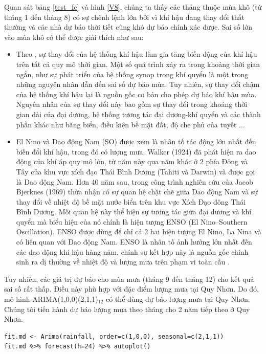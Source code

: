 \documentclass[12pt, a4paper,oneside]{book}
\theoremstyle{definition}
\begin{document}
Quan sát bảng \ref{test_fc} và hình \ref{V8}, chúng ta thấy các tháng thuộc mùa khô (từ tháng 1 đến tháng 8) có sự chênh lệnh lớn bởi vì khí hậu đang thay đổi thất thường và các nhà dự báo thời tiết cũng khó dự báo chính xác được. Sai số lớn vào mùa khô có thể được giải thích như sau:
\begin{itemize}
	\item Theo \cite{22}, sự thay đổi của hệ thống khí hậu làm gia tăng biến động của khí hậu trên tất cả quy mô thời gian. Một số quá trình xảy ra trong khoảng thời gian ngắn, như sự phát triển của hệ thống synop trong khí quyển là một trong những nguyên nhân dẫn đến sai số dự báo mùa. Tuy nhiên, sự thay đổi chậm của hệ thống khí hậu lại là nguồn gốc cơ bản cho phép dự báo khí hậu mùa. Nguyên nhân của sự thay đổi này bao gồm sự thay đổi trong khoảng thời gian dài của đại dương, hệ thống tương tác đại dương-khí quyển và các thành phần khác như băng biển, điều kiện bề mặt đất, độ che phủ của tuyết ...
	\item El Nino và Dao động Nam (SO) được xem là nhân tố tác động lớn nhất đến biến đổi khí hậu, trong đó có lượng mưa. Walker (1924) đã phát hiện ra dao động của khí áp quy mô lớn, từ năm này qua năm khác ở 2 phía Đông và Tây của khu vực xích đạo Thái Bình Dương (Tahiti và Darwin) và được gọi là Dao động Nam. Hơn 40 năm sau, trong công trình nghiên cứu của Jacob Bjerknes (1969) thừa nhận có sự quan hệ chặt chẽ giữa Dao động Nam và sự thay đổi về nhiệt độ bề mặt nước biển trên khu vực Xích Đạo đông Thái Bình Dương. Mối quan hệ này thể hiện sự tương tác giữa đại dương và khí quyển mà biểu hiện của nó chính là hiện tượng ENSO (El Nino–Southern Oscillation). ENSO được dùng để chỉ cả 2 hai hiện tượng El Nino, La Nina và có liên quan với Dao động Nam. ENSO là nhân tố ảnh hưởng lớn nhất đến các dao động khí hậu hàng năm, chính sự kết hợp này là nguồn gốc chính sinh ra dị thường về nhiệt độ và lượng mưa trên phạm vi toàn cầu \cite{22, 23, 24}.
\end{itemize}
Tuy nhiên, các giá trị dự báo cho mùa mưa (tháng 9 đến tháng 12) cho kết quả sai số rất thấp. Điều này phù hợp với đặc điểm lượng mưa tại Quy Nhơn. Do đó, mô hình ARIMA(1,0,0)(2,1,1)$_{12}$ có thể dùng dự báo lượng mưa tại Quy Nhơn. Chúng tôi tiến hành dự báo lượng mưa theo tháng cho 2 năm tiếp theo ở Quy Nhơn.
\begin{lstlisting}
fit.md <- Arima(rainfall, order=c(1,0,0), seasonal=c(2,1,1))
fit.md %>% forecast(h=24) %>% autoplot()
\end{lstlisting}
\end{document}
